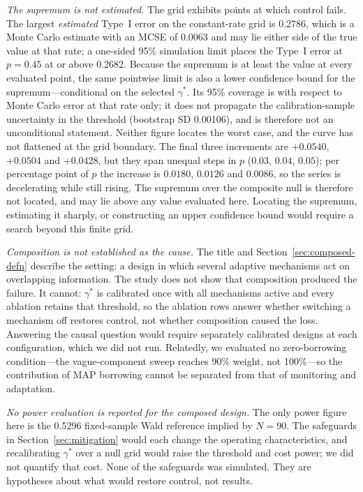 \documentclass[11pt]{article}
\begin{document}
\emph{The supremum is not estimated.}  The grid exhibits points at which
control fails.  The largest \emph{estimated} Type~I error on the constant-rate
grid is 0.2786, which is a Monte Carlo estimate with an MCSE of 0.0063 and may
lie either side of the true value at that rate; a one-sided 95\% simulation
limit places the Type~I error at $p=0.45$ at or above 0.2682.  Because the
supremum is at least the value at every evaluated point, the same pointwise
limit is also a lower confidence bound for the supremum---conditional on the
selected $\gamma^*$.  Its 95\% coverage is with respect to Monte Carlo error at
that rate only; it does not propagate the calibration-sample uncertainty in the
threshold (bootstrap SD 0.00106), and is therefore not an unconditional
statement.  Neither
figure locates the worst case, and
the curve has not flattened at the grid boundary.  The final three increments
are $+0.0540$, $+0.0504$ and $+0.0428$, but they span unequal steps in $p$
($0.03$, $0.04$, $0.05$); per percentage point of $p$ the increase is
$0.0180$, $0.0126$ and $0.0086$, so the series is decelerating while still
rising.  The supremum over
the composite null is therefore not located, and may lie above any value
evaluated here.  Locating the supremum, estimating it sharply, or constructing
an upper confidence bound would require a search beyond this finite grid.

\emph{Composition is not established as the cause.}  The title and
Section~\ref{sec:composed-defn} describe the setting: a design in which several
adaptive mechanisms act on overlapping information.  The study does not show
that composition produced the failure.  It cannot: $\gamma^*$ is calibrated once
with all mechanisms active and every ablation retains that threshold, so the
ablation rows answer whether switching a mechanism off restores control, not
whether composition caused the loss.  Answering the causal question would
require separately calibrated designs at each configuration, which we did not
run.  Relatedly, we evaluated no zero-borrowing condition---the vague-component
sweep reaches 90\% weight, not 100\%---so the contribution of MAP borrowing
cannot be separated from that of monitoring and adaptation.

\emph{No power evaluation is reported for the composed design.}  The only power
figure here is the 0.5296 fixed-sample Wald reference implied by $N=90$.  The
safeguards in Section~\ref{sec:mitigation} would each change the operating
characteristics, and recalibrating $\gamma^*$ over a null grid would raise the
threshold and cost power; we did not quantify that cost.  None of the
safeguards was simulated.  They are hypotheses about what would restore
control, not results.
\end{document}
